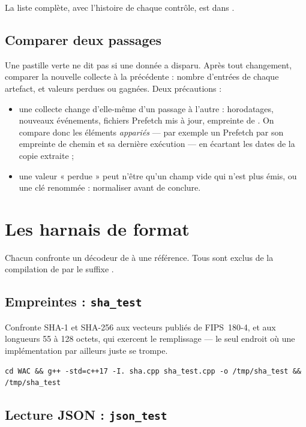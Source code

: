 \documentclass[11pt,a4paper,oneside]{report}
\begin{document}
La liste complète, avec l'histoire de chaque contrôle, est dans
.

\section{Comparer deux passages}\label{sec:comparer}

Une pastille verte ne dit pas si une donnée a disparu. Après tout changement,
comparer la nouvelle collecte à la précédente : nombre d'entrées de chaque
artefact, et valeurs perdues ou gagnées. Deux précautions :

\begin{itemize}
  \item une collecte change d'elle-même d'un passage à l'autre : horodatages,
    nouveaux événements, fichiers Prefetch mis à jour, empreinte de
    . On compare donc les éléments \emph{appariés} — par exemple
    un Prefetch par son empreinte de chemin et sa dernière exécution — en
    écartant les dates de la copie extraite ;
  \item une valeur « perdue » peut n'être qu'un champ vide qui n'est plus émis,
    ou une clé renommée : normaliser avant de conclure.
\end{itemize}

\chapter{Les harnais de format}\label{ch:format}

Chacun confronte un décodeur de \wac{} à une référence. Tous sont exclus de la
compilation de \wac{} par le suffixe .

\section{Empreintes : \texttt{sha\_test}}

Confronte SHA-1 et SHA-256 aux vecteurs publiés de FIPS~180-4, et aux longueurs
55 à 128 octets, qui exercent le remplissage — le seul endroit où une
implémentation par ailleurs juste se trompe.

\begin{lstlisting}
cd WAC && g++ -std=c++17 -I. sha.cpp sha_test.cpp -o /tmp/sha_test && /tmp/sha_test
\end{lstlisting}

\section{Lecture JSON : \texttt{json\_test}}
\end{document}
